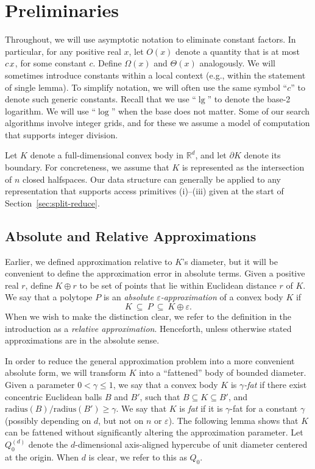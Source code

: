 \documentclass[11pt]{article}   \usepackage[letterpaper,hmargin=2.1cm,vmargin=3cm]{geometry}
\newcommand{\RE}{\mathbb{R}}    \newcommand{\ZZ}{\mathbb{Z}}    \newcommand{\eps}{\varepsilon}  \newcommand{\ST}{\,:\,}         \newcommand{\sq}{\square}
\newcommand{\radius}{\mathrm{radius}}
\renewcommand{\P}{\kern+1pt}    \newcommand{\N}{\kern-2pt}      \newcommand{\NN}{\kern-4pt}     \newcommand{\polar}[1]{\mathrm{polar}(#1)}            \newcommand{\polarX}[2]{\mathrm{polar}_{#1}(#2)}
\begin{document}
\section{Preliminaries} \label{sec:prelim}


Throughout, we will use asymptotic notation to eliminate constant factors. In particular, for any positive real $x$, let $O(x)$ denote a quantity that is at most $c \P x$, for some constant $c$. Define $\Omega(x)$ and $\Theta(x)$ analogously. We will sometimes introduce constants within a local context (e.g., within the statement of single lemma). To simplify notation, we will often use the same symbol ``$c$'' to denote such generic constants. Recall that we use ``$\lg$'' to denote the base-2 logarithm. We will use ``$\log$'' when the base does not matter. Some of our search algorithms involve integer grids, and for these we assume a model of computation that supports integer division. 

Let $K$ denote a full-dimensional convex body in $\RE^d$, and let $\partial K$ denote its boundary. For concreteness, we assume that $K$ is represented as the intersection of $n$ closed halfspaces. Our data structure can generally be applied to any representation that supports access primitives (i)--(iii) given at the start of Section~\ref{sec:split-reduce}.

\subsection{Absolute and Relative Approximations} \label{sec:prelim-abs}


Earlier, we defined approximation relative to $K$'s diameter, but it will be convenient to define the approximation error in absolute terms. Given a positive real $r$, define $K \oplus r$ to be set of points that lie within Euclidean distance $r$ of $K$. We say that a polytope $P$ is an \emph{absolute $\eps$-approximation} of a convex body $K$ if 
\[
	K ~\subseteq~ P ~\subseteq~ K \oplus \eps.
\]
When we wish to make the distinction clear, we refer to the definition in the introduction as a \emph{relative approximation}. Henceforth, unless otherwise stated approximations are in the absolute sense.

In order to reduce the general approximation problem into a more convenient absolute form, we will transform $K$ into a ``fattened'' body of bounded diameter. Given a parameter $0 < \gamma \le 1$, we say that a convex body $K$ is \emph{$\gamma$-fat} if there exist concentric Euclidean balls $B$ and $B'$, such that $B \subseteq K \subseteq B'$, and $\radius(B)/\radius(B') \ge \gamma$. We say that $K$ is \emph{fat} if it is $\gamma$-fat for a constant $\gamma$ (possibly depending on $d$, but not on $n$ or $\eps$). The following lemma shows that $K$ can be fattened without significantly altering the approximation parameter. Let $Q_0^{(d)}$ denote the $d$-dimensional axis-aligned hypercube of unit diameter centered at the origin. When $d$ is clear, we refer to this as $Q_0$.
\end{document}
